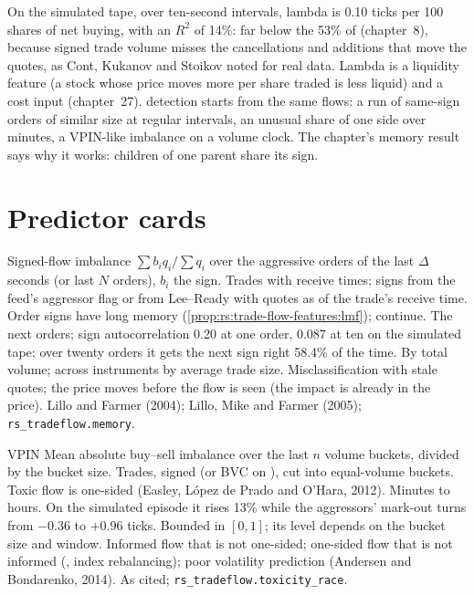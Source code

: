 On the simulated tape, over ten-second intervals, lambda is 0.10 ticks per 100 shares of net buying, with an $R^2$ of 14\%: far below the
53\% of  (chapter~8), because signed trade volume misses the cancellations and additions that move the quotes, as Cont,
Kukanov and Stoikov noted for real data. Lambda is a liquidity feature (a stock whose price moves more per share traded is less liquid)
and a cost input (chapter~27).  detection starts from the same flows: a run of same-sign orders of similar size at regular
intervals, an unusual share of one side over minutes, a VPIN-like imbalance on a volume clock. The chapter's memory result says why it
works: children of one parent share its sign.

\section{Predictor cards}

\begin{predictorcard}{Signed-flow imbalance}\label{pred:rs:trade-flow-features:signed}
 $\sum b_iq_i/\sum q_i$ over the aggressive orders of the last $\Delta$ seconds (or last $N$ orders), $b_i$ the sign.
 Trades with receive times; signs from the feed's aggressor flag or from Lee--Ready with quotes as of the
trade's receive time.
 Order signs have long memory (\cref{prop:rs:trade-flow-features:lmf});  continue.
 The next orders; sign autocorrelation 0.20 at one order, 0.087 at ten on the simulated tape; over twenty orders it gets the next sign right 58.4\% of the time.
 By total volume; across instruments by average trade size.
 Misclassification with stale quotes; the price moves before the flow is seen (the impact is already in the price).
 Lillo and Farmer (2004); Lillo, Mike and Farmer (2005); \texttt{rs\_tradeflow.memory}.
\end{predictorcard}

\begin{predictorcard}{VPIN}\label{pred:rs:trade-flow-features:vpin}
 Mean absolute buy--sell imbalance over the last $n$ volume buckets, divided by the bucket size.
 Trades, signed (or BVC on ), cut into equal-volume buckets.
 Toxic flow is one-sided (Easley, López de Prado and O'Hara, 2012).
 Minutes to hours. On the simulated episode it rises 13\% while the aggressors' mark-out turns from $-0.36$
to $+0.96$ ticks.
 Bounded in $[0, 1]$; its level depends on the bucket size and window.
 Informed flow that is not one-sided; one-sided flow that is not informed (, index rebalancing); poor
volatility prediction (Andersen and Bondarenko, 2014).
 As cited; \texttt{rs\_tradeflow.toxicity\_race}.
\end{predictorcard}

